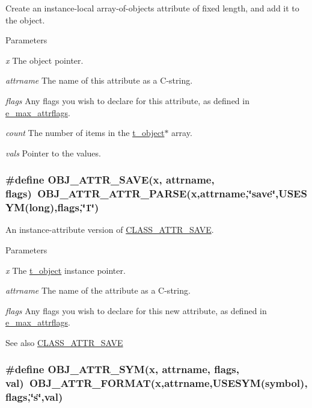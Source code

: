 Create an instance-\/local array-\/of-\/objects attribute of fixed length, and add it to the object. 
\begin{DoxyParams}{Parameters}
\item[{\em x}]The object pointer. \item[{\em attrname}]The name of this attribute as a C-\/string. \item[{\em flags}]Any flags you wish to declare for this attribute, as defined in \hyperlink{group__attr_gaf296cfc6741bb19207f6ed8062809115}{e\_\-max\_\-attrflags}. \item[{\em count}]The number of items in the \hyperlink{structt__object}{t\_\-object}$\ast$ array. \item[{\em vals}]Pointer to the values. \end{DoxyParams}
\hypertarget{group__attr_ga7488ec772db17fb474a096890b6d14da}{
\subsubsection[{OBJ\_\-ATTR\_\-SAVE}]{\setlength{\rightskip}{0pt plus 5cm}\#define OBJ\_\-ATTR\_\-SAVE(x, \/  attrname, \/  flags)~OBJ\_\-ATTR\_\-ATTR\_\-PARSE(x,attrname,\char`\"{}save\char`\"{},USESYM(long),flags,\char`\"{}1\char`\"{})}}
\label{group__attr_ga7488ec772db17fb474a096890b6d14da}


An instance-\/attribute version of \hyperlink{group__attr_gaf56dc31d0defad3cdc1ee60b611acc79}{CLASS\_\-ATTR\_\-SAVE}. 
\begin{DoxyParams}{Parameters}
\item[{\em x}]The \hyperlink{structt__object}{t\_\-object} instance pointer. \item[{\em attrname}]The name of the attribute as a C-\/string. \item[{\em flags}]Any flags you wish to declare for this new attribute, as defined in \hyperlink{group__attr_gaf296cfc6741bb19207f6ed8062809115}{e\_\-max\_\-attrflags}. \end{DoxyParams}
\begin{DoxySeeAlso}{See also}
\hyperlink{group__attr_gaf56dc31d0defad3cdc1ee60b611acc79}{CLASS\_\-ATTR\_\-SAVE} 
\end{DoxySeeAlso}
\hypertarget{group__attr_ga1f650601b65a6faa39ad53f6faa52e0e}{
\subsubsection[{OBJ\_\-ATTR\_\-SYM}]{\setlength{\rightskip}{0pt plus 5cm}\#define OBJ\_\-ATTR\_\-SYM(x, \/  attrname, \/  flags, \/  val)~OBJ\_\-ATTR\_\-FORMAT(x,attrname,USESYM(symbol),flags,\char`\"{}s\char`\"{},val)}}
\label{group__attr_ga1f650601b65a6faa39ad53f6faa52e0e}


